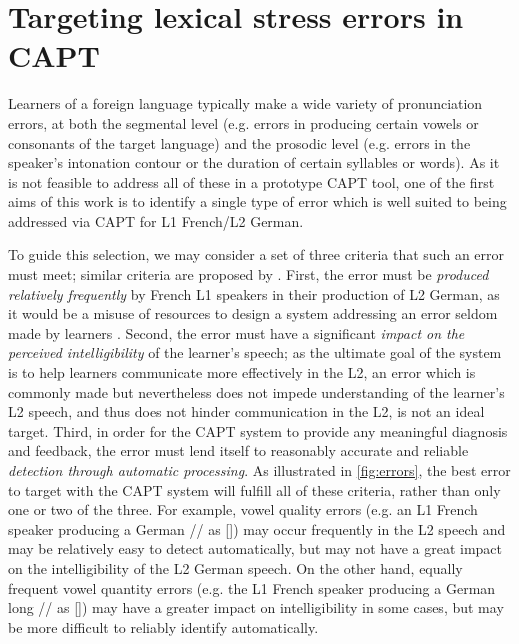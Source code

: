  \section{Targeting lexical stress errors in CAPT}
 \label{sec:bkgd:targeting}
 	Learners of a foreign language typically make a wide variety of pronunciation errors, at both the segmental level (e.g. errors in producing certain vowels or consonants of the target language) and the prosodic level (e.g. errors in the speaker's intonation contour or the duration of certain syllables or words). 
 As it is not feasible to address all of these in a prototype CAPT tool, 
one of the first aims of this work is to identify a single type of error which is well suited to being addressed via CAPT for L1 French/L2 German.
	
	To guide this selection, we may consider %
a set of three criteria that such an error must meet; similar criteria are proposed by \textcite{Cucchiarini2009}.
%
First, 
the error must be \textit{produced relatively frequently} by French L1 speakers in their production of L2 German, as it would be a misuse of resources to design a system addressing an error seldom made by learners \citep{Neri2002}.
Second,
the error must have a significant \textit{impact on the perceived intelligibility} of the learner's speech; 
as the ultimate goal of the system is to help learners communicate more effectively in the L2,
 an error which is commonly made but nevertheless does not impede understanding of the learner's L2 speech, and thus does not hinder communication in the L2, is not an ideal target. 
Third,
in order for the CAPT system to provide any meaningful diagnosis and feedback, the error must lend itself to reasonably accurate and reliable  \textit{detection through automatic processing}. 
%
%
%
As illustrated in \cref{fig:errors}, the best error to target with the CAPT system will fulfill all of these criteria, rather than only one or two of the three. 
	 For example, vowel quality errors (e.g. an L1 French speaker producing a German // as [\textipa{\oe}]) may occur frequently in the L2 speech and may be relatively easy to detect automatically, but may not have a great impact on the intelligibility of the L2 German speech. On the other hand, equally frequent vowel quantity errors (e.g. the L1 French speaker producing a German long // as []) may have a greater impact on intelligibility in some cases, but may be more difficult to reliably identify automatically.

